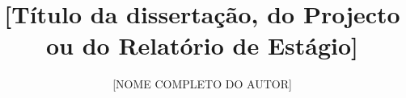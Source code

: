 \documentclass[msc,pt,twoside,12pt,a4paper]{thesisisel}
\title{[Título da dissertação, do Projecto ou do Relatório de Estágio]}
\author[f]{\uppercase{[Nome completo do autor]}}
\begin{document}
\frontmatter



\printdedicatory

\printacknowledgements

\printabstract


\printnomenclature
%
\tableofcontents 
%
\printotherlists 
%

\printchapters

\nocite{*}


\end{document}
